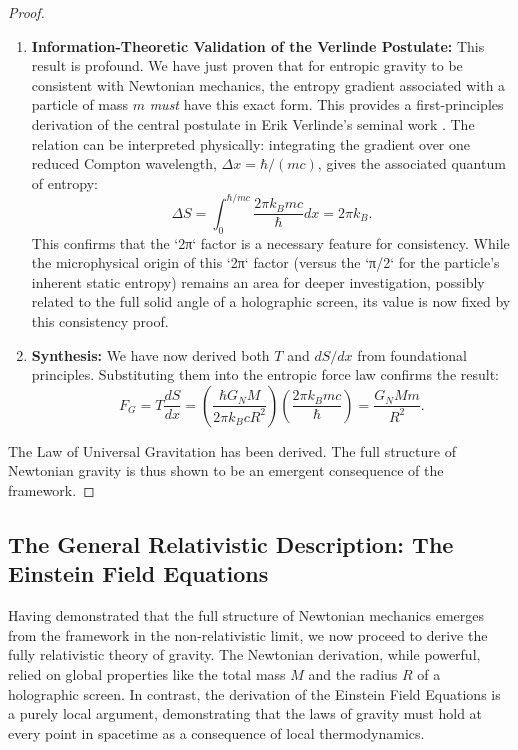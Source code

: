 \documentclass[11pt, letterpaper]{report}
\theoremstyle{plain} %
\theoremstyle{definition} %
\theoremstyle{remark} %
\begin{document}
\begin{proof}
\begin{enumerate}
    \item \textbf{Information-Theoretic Validation of the Verlinde Postulate:} This result is profound. We have just proven that for entropic gravity to be consistent with Newtonian mechanics, the entropy gradient associated with a particle of mass $m$ \textit{must} have this exact form. This provides a first-principles derivation of the central postulate in Erik Verlinde's seminal work \cite{Verlinde2011}. The relation can be interpreted physically: integrating the gradient over one reduced Compton wavelength, $\Delta x = \hbar/(mc)$, gives the associated quantum of entropy:
    $$ \Delta S = \int_0^{\hbar/mc} \frac{2\pi k_B m c}{\hbar} dx = 2\pi k_B. $$
    This confirms that the `2π` factor is a necessary feature for consistency. While the microphysical origin of this `2π` factor (versus the `π/2` for the particle's inherent static entropy) remains an area for deeper investigation, possibly related to the full solid angle of a holographic screen, its value is now fixed by this consistency proof.

    \item \textbf{Synthesis:} We have now derived both $T$ and $dS/dx$ from foundational principles. Substituting them into the entropic force law confirms the result:
    $$ F_G = T \frac{dS}{dx} = \left( \frac{\hbar G_N M}{2\pi k_B c R^2} \right) \left( \frac{2\pi k_B m c}{\hbar} \right) = \frac{G_N M m}{R^2}. $$
\end{enumerate}
The Law of Universal Gravitation has been derived. The full structure of Newtonian gravity is thus shown to be an emergent consequence of the framework.
\end{proof}

\subsection{The General Relativistic Description: The Einstein Field Equations}
\label{subsec:verify_efe_thermo_revised}

Having demonstrated that the full structure of Newtonian mechanics emerges from the framework in the non-relativistic limit, we now proceed to derive the fully relativistic theory of gravity. The Newtonian derivation, while powerful, relied on global properties like the total mass $M$ and the radius $R$ of a holographic screen. In contrast, the derivation of the Einstein Field Equations is a purely local argument, demonstrating that the laws of gravity must hold at every point in spacetime as a consequence of local thermodynamics.
\end{document}
